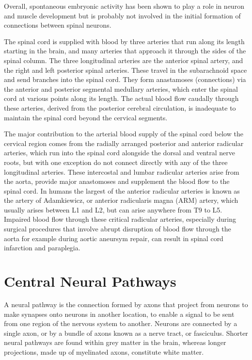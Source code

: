 Overall, spontaneous embryonic activity has been shown to play a role in neuron and muscle development but is probably not involved in the initial formation of connections between spinal neurons.

The spinal cord is supplied with blood by three arteries that run along its length starting in the brain, and many arteries that approach it through the sides of the spinal column. The three longitudinal arteries are the anterior spinal artery, and the right and left posterior spinal arteries. These travel in the subarachnoid space and send branches into the spinal cord. They form anastamoses (connections) via the anterior and posterior segmental medullary arteries, which enter the spinal cord at various points along its length. The actual blood flow caudally through these arteries, derived from the posterior cerebral circulation, is inadequate to maintain the spinal cord beyond the cervical segments.

The major contribution to the arterial blood supply of the spinal cord below the cervical region comes from the radially arranged posterior and anterior radicular arteries, which run into the spinal cord alongside the dorsal and ventral nerve roots, but with one exception do not connect directly with any of the three longitudinal arteries. These intercostal and lumbar radicular arteries arise from the aorta, provide major anastomoses and supplement the blood flow to the spinal cord. In humans the largest of the anterior radicular arteries is known as the artery of Adamkiewicz, or anterior radicularis magna (ARM) artery, which usually arises between L1 and L2, but can arise anywhere from T9 to L5. Impaired blood flow through these critical radicular arteries, especially during surgical procedures that involve abrupt disruption of blood flow through the aorta for example during aortic aneursym repair, can result in spinal cord infarction and paraplegia.

\hypertarget{central-neural-pathways}{%
\section{Central Neural Pathways}\label{central-neural-pathways}}

A neural pathway is the connection formed by axons that project from neurons to make synapses onto neurons in another location, to enable a signal to be sent from one region of the nervous system to another. Neurons are connected by a single axon, or by a bundle of axons known as a nerve tract, or fasciculus. Shorter neural pathways are found within grey matter in the brain, whereas longer projections, made up of myelinated axons, constitute white matter.

